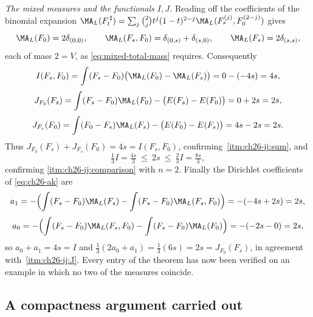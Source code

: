 \begin{example}
\emph{The mixed measures and the functionals $I,J$.}  Reading off the
coefficients of the binomial expansion
$\MA_L(F^{\,\sharp}_t)=\sum_j\binom2jt^j(1-t)^{2-j}
\MA_L(F_s^{(j)},F_0^{(2-j)})$ gives
\[
 \MA_L(F_0)=2\delta_{(0,0)},\qquad
 \MA_L(F_s,F_0)=\delta_{(0,s)}+\delta_{(s,0)},\qquad
 \MA_L(F_s)=2\delta_{(s,s)},
\]
each of mass $2=V$, as \eqref{eq:mixed-total-mass} requires.  Consequently
\[
 I(F_s,F_0)=\int(F_s-F_0)\bigl(\MA_L(F_0)-\MA_L(F_s)\bigr)
 =0-(-4s)=4s,
\]
\[
 J_{F_0}(F_s)=\int(F_s-F_0)\MA_L(F_0)-\bigl(E(F_s)-E(F_0)\bigr)
 =0+2s=2s,
\]
\[
 J_{F_s}(F_0)=\int(F_0-F_s)\MA_L(F_s)-\bigl(E(F_0)-E(F_s)\bigr)
 =4s-2s=2s .
\]
Thus $J_{F_0}(F_s)+J_{F_s}(F_0)=4s=I(F_s,F_0)$, confirming
\,\cref{itm:ch26-ij:sum}, and
\[
 \tfrac13I=\tfrac{4s}{3}\ \leq\ 2s\ \leq\ \tfrac23I=\tfrac{8s}{3},
\]
confirming \cref{itm:ch26-ij:comparison} with $n=2$.  Finally the Dirichlet
coefficients of \eqref{eq:ch26-ak} are
\[
 a_1=-\Bigl(\int(F_s-F_0)\MA_L(F_s)
   -\int(F_s-F_0)\MA_L(F_s,F_0)\Bigr)=-(-4s+2s)=2s,
\]
\[
 a_0=-\Bigl(\int(F_s-F_0)\MA_L(F_s,F_0)
   -\int(F_s-F_0)\MA_L(F_0)\Bigr)=-(-2s-0)=2s,
\]
so $a_0+a_1=4s=I$ and
$\tfrac13(2a_0+a_1)=\tfrac13(6s)=2s=J_{F_0}(F_s)$, in agreement with
\,\cref{itm:ch26-ij:J}.  Every entry of
the theorem has now been verified on an example in which no two of the
measures coincide.
\end{example}

\subsection{A compactness argument carried out}
\label{sec:ch26-ex-compactness}

